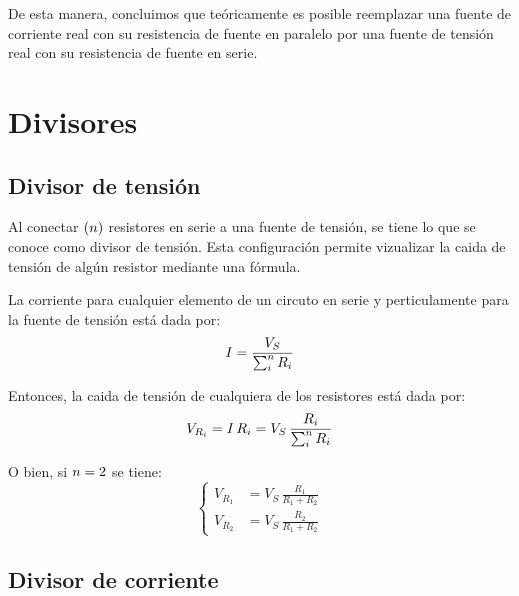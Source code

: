 \documentclass[a5paper,12pt,twoside]{book}
\begin{document}
De esta manera, concluimos que teóricamente es posible reemplazar una fuente de corriente real con su resistencia de fuente en paralelo por una fuente de tensión real con su resistencia de fuente en serie.




\section{Divisores}

\subsection*{Divisor de tensión}

Al conectar $(n)$ resistores en serie a una fuente de tensión, se tiene lo que se conoce como divisor de tensión. Esta configuración permite vizualizar la caida de tensión de algún resistor mediante una fórmula.

\begin{center}
    \def\svgwidth{0.5\linewidth}
    
\end{center}

La corriente para cualquier elemento de un circuto en serie y perticulamente para la fuente de tensión está dada por:
\begin{equation*}
    I = \frac{V_S}{\sum_i^n R_i}
\end{equation*}

Entonces, la caida de tensión de cualquiera de los resistores está dada por:
\begin{equation*}
    V_{R_i} = I \, R_i = V_S \, \frac{R_i}{\sum_i^n R_i}
\end{equation*}

O bien, si $n=2$ se tiene:
\begin{equation*}
    \left\{
    \begin{aligned}
        V_{R_1} &= V_S \, \frac{R_1}{R_1 + R_2}
        \\[1ex]
        V_{R_2} &= V_S \, \frac{R_2}{R_1 + R_2}
    \end{aligned}
    \right.
\end{equation*}


\subsection*{Divisor de corriente}
\end{document}
